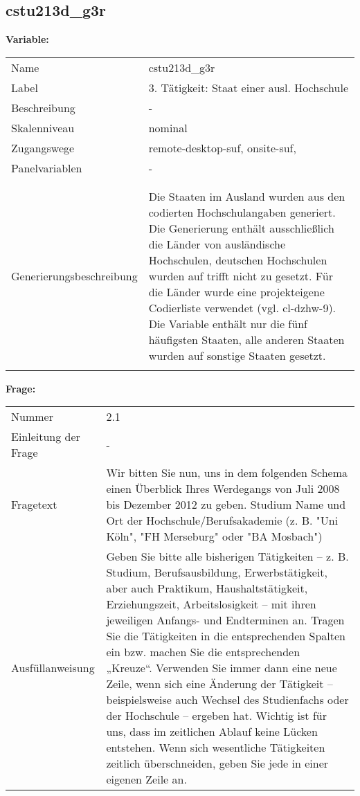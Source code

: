 	
	
	\subsection{cstu213d\_g3r}
	\label{subSection:cstu213d_g3r}

	\noindent\textbf{Variable:}\\
		\begin{tabular}{lL{11.3cm}}
			\label{tableVariable:cstu213d_g3r}
			Name & cstu213d\_g3r \\
			Label & 3. Tätigkeit: Staat einer ausl. Hochschule \\
			Beschreibung & - \\
			Skalenniveau & nominal \\
			Zugangswege &
				remote-desktop-suf,
				onsite-suf,
 \\
			Panelvariablen & -
			 \\
			 \\
 \\
					Generierungsbeschreibung & Die Staaten im Ausland wurden aus den codierten Hochschulangaben generiert. Die Generierung enthält ausschließlich die Länder von ausländische Hochschulen, deutschen Hochschulen wurden auf trifft nicht zu gesetzt. Für die Länder wurde eine projekteigene Codierliste verwendet (vgl. cl-dzhw-9). Die Variable enthält nur die fünf häufigsten Staaten, alle anderen Staaten wurden auf sonstige Staaten gesetzt. 
				 \\	
			 \\
		\end{tabular}

		\vspace*{1 cm}
		\noindent\textbf{Frage:}\\
		\begin{tabular}{lL{11.3cm}}
			\label{tableQuestion:cstu213d_g3r}
			Nummer & 2.1 \\
			Einleitung der Frage & - \\
			Fragetext & Wir bitten Sie nun, uns in dem folgenden Schema einen Überblick Ihres Werdegangs von Juli 2008 bis Dezember 2012 zu geben.
Studium
Name und Ort der Hochschule/Berufsakademie
(z. B. "Uni Köln", "FH Merseburg" oder "BA Mosbach") \\
			Ausfüllanweisung & Geben Sie bitte alle bisherigen Tätigkeiten – z. B. Studium, Berufsausbildung, Erwerbstätigkeit, aber auch Praktikum, Haushaltstätigkeit,
Erziehungszeit, Arbeitslosigkeit – mit ihren jeweiligen Anfangs- und Endterminen an. Tragen Sie die Tätigkeiten in die entsprechenden Spalten ein bzw. machen Sie die entsprechenden „Kreuze“. Verwenden Sie immer dann eine neue Zeile, wenn sich eine Änderung der Tätigkeit – beispielsweise auch Wechsel des Studienfachs oder der Hochschule – ergeben hat. Wichtig ist für uns, dass im zeitlichen Ablauf keine Lücken entstehen. Wenn sich wesentliche Tätigkeiten zeitlich überschneiden, geben Sie jede in einer eigenen Zeile an. \\
		\end{tabular}





